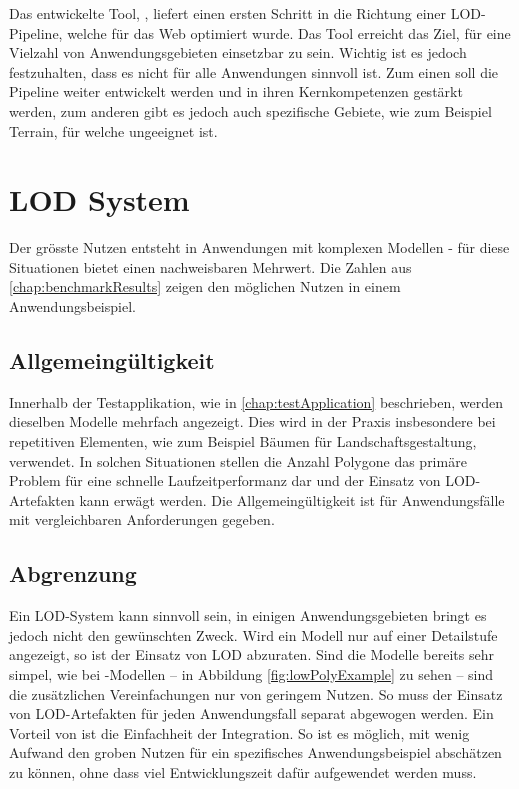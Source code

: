 Das entwickelte Tool, , liefert einen ersten Schritt in die Richtung einer LOD-Pipeline, welche für das Web optimiert wurde. Das Tool erreicht das Ziel, für eine Vielzahl von Anwendungsgebieten einsetzbar zu sein. Wichtig ist es jedoch festzuhalten, dass es nicht für alle Anwendungen sinnvoll ist. Zum einen soll die Pipeline weiter entwickelt werden und in ihren Kernkompetenzen gestärkt werden, zum anderen gibt es jedoch auch spezifische Gebiete, wie zum Beispiel Terrain, für welche  ungeeignet ist.

\section{LOD System}

Der grösste Nutzen entsteht in Anwendungen mit komplexen Modellen - für diese Situationen bietet  einen nachweisbaren Mehrwert. Die Zahlen aus \autoref{chap:benchmarkResults} zeigen den möglichen Nutzen in einem Anwendungsbeispiel.

\subsection{Allgemeingültigkeit}

Innerhalb der Testapplikation, wie in \autoref{chap:testApplication} beschrieben, werden dieselben Modelle mehrfach angezeigt. Dies wird in der Praxis insbesondere bei repetitiven Elementen, wie zum Beispiel Bäumen für Landschaftsgestaltung, verwendet. In solchen Situationen stellen die Anzahl Polygone das primäre Problem für eine schnelle Laufzeitperformanz dar und der Einsatz von LOD-Artefakten kann erwägt werden. Die Allgemeingültigkeit ist für Anwendungsfälle mit vergleichbaren Anforderungen gegeben.

\subsection{Abgrenzung}

Ein LOD-System kann sinnvoll sein, in einigen Anwendungsgebieten bringt es jedoch nicht den gewünschten Zweck. Wird ein Modell nur auf einer Detailstufe angezeigt, so ist der Einsatz von LOD abzuraten. Sind die Modelle bereits sehr simpel, wie bei -Modellen – in Abbildung \ref{fig:lowPolyExample} zu sehen – sind die zusätzlichen Vereinfachungen nur von geringem Nutzen.
So muss der Einsatz von LOD-Artefakten für jeden Anwendungsfall separat abgewogen werden. Ein Vorteil von  ist die Einfachheit der Integration. So ist es möglich, mit wenig Aufwand den groben Nutzen für ein spezifisches Anwendungsbeispiel abschätzen zu können, ohne dass viel Entwicklungszeit dafür aufgewendet werden muss.

